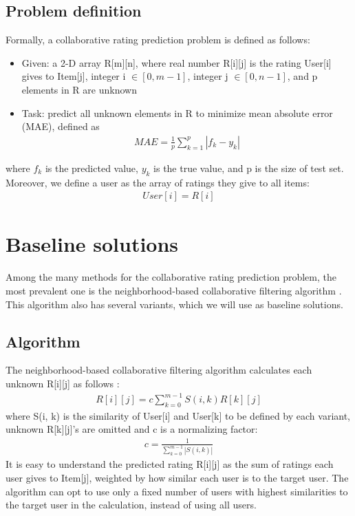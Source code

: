 \documentclass[conference]{IEEEtran}
\begin{document}
\subsection{Problem definition}
Formally, a collaborative rating prediction problem is defined as follows:
\begin{itemize}
	\item Given: a 2-D array R[m][n], 
	where real number R[i][j] is the rating User[i] gives to Item[j],
	integer i $ \in [0, m-1] $, integer j $ \in [0, n-1] $,
	and p elements in R are unknown
	\item Task: predict all unknown elements in R to minimize mean absolute error (MAE), defined as
	\begin{align*}
	MAE = \frac{1}{p} \sum_{k = 1}^{p}|f_k - y_k|
	\end{align*}
\end{itemize}
where $ f_k $ is the predicted value, $ y_k $ is the true value, and p is the 
size of test set.
Moreover, we define a user as the array of ratings they give to all items: 
\begin{align*}
User[i] = R[i]
\end{align*}

\section{Baseline solutions}
Among the many methods for the collaborative rating prediction problem,
the most prevalent one is the neighborhood-based collaborative filtering 
algorithm \cite{su2009survey}.
This algorithm also has several variants,
which we will use as baseline solutions.

\subsection{Algorithm}
The neighborhood-based collaborative filtering algorithm calculates each 
unknown R[i][j] as 
follows \cite{su2009survey}:
\begin{align*}
R[i][j] = c \sum_{k = 0}^{m-1} S(i, k) R[k][j]
\end{align*}
where S(i, k) is the similarity of User[i] and User[k] to be defined by each 
variant,
unknown R[k][j]'s are omitted and c is a normalizing factor:
\begin{align*}
c = \frac{1}{\sum_{k = 0}^{m - 1} |S(i, k)|}
\end{align*}
It is easy to understand the predicted rating R[i][j] as 
the sum of ratings each user gives to Item[j],
weighted by how similar each user is to the target user.
The algorithm can opt to use only a fixed number of users with highest 
similarities to the target user in the calculation, instead of using all users.
\end{document}
